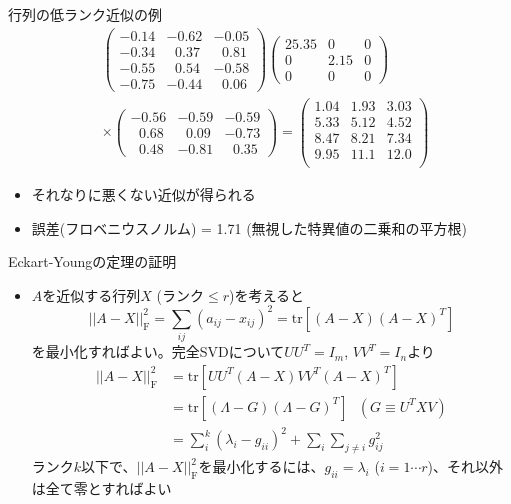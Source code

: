\begin{frame}[t,fragile]{行列の低ランク近似の例}
  \[
  \begin{split}
    &\begin{pmatrix}
      -0.14 & -0.62 & -0.05 \\
      -0.34 & \ \ \,0.37 & \ \ \,0.81 \\
      -0.55 & \ \ \,0.54 & -0.58 \\
      -0.75 & -0.44 & \ \ \,0.06      
    \end{pmatrix}
    \begin{pmatrix}
      25.35 & 0 & 0 \\
      0 & 2.15 & 0 \\
      0 & 0 & 0
    \end{pmatrix} \\
    & \times
    \begin{pmatrix}
      -0.56 & -0.59 & -0.59 \\
      \ \ \,0.68 & \ \ \,0.09 & -0.73 \\
      \ \ \,0.48 & -0.81 & \ \ \,0.35
    \end{pmatrix}
    = 
    \begin{pmatrix}
      1.04 & 1.93 & 3.03 \\
      5.33 & 5.12 & 4.52 \\
      8.47 & 8.21 & 7.34 \\
      9.95 & 11.1 & 12.0 \\
    \end{pmatrix}
  \end{split}
  \]
  \begin{itemize}
  \item それなりに悪くない近似が得られる
  \item 誤差(フロベニウスノルム) = 1.71 (無視した特異値の二乗和の平方根)
  \end{itemize}
\end{frame}

\begin{frame}[t,fragile]{Eckart-Youngの定理の証明}
  \begin{itemize}
    \setlength{\itemsep}{1em}
  \item $A$を近似する行列$X$ (ランク$\le r$)を考えると
    \[
    ||A-X||_\mathrm{F}^2 = \sum_{ij}(a_{ij}-x_{ij})^2 = \text{tr} [(A-X)(A-X)^T]
    \]
    を最小化すればよい。完全SVDについて$UU^T=I_m$, $VV^T = I_n$より
    \[
    \begin{split}
      ||A-X||_\mathrm{F}^2 &= \text{tr} [UU^T(A-X)VV^T(A-X)^T] \\
      &= \text{tr} [(\Lambda-G)(\Lambda-G)^T]  \ \ \ (G \equiv U^TXV)\\
      &= \sum_i^k (\lambda_i - g_{ii})^2 + \sum_i \sum_{j \ne i} g_{ij}^2
    \end{split}
    \]
    ランク$k$以下で、$||A-X||_\mathrm{F}^2$を最小化するには、$g_{ii}=\lambda_i$ ($i=1 \cdots r$)、それ以外は全て零とすればよい
  \end{itemize}
\end{frame}

